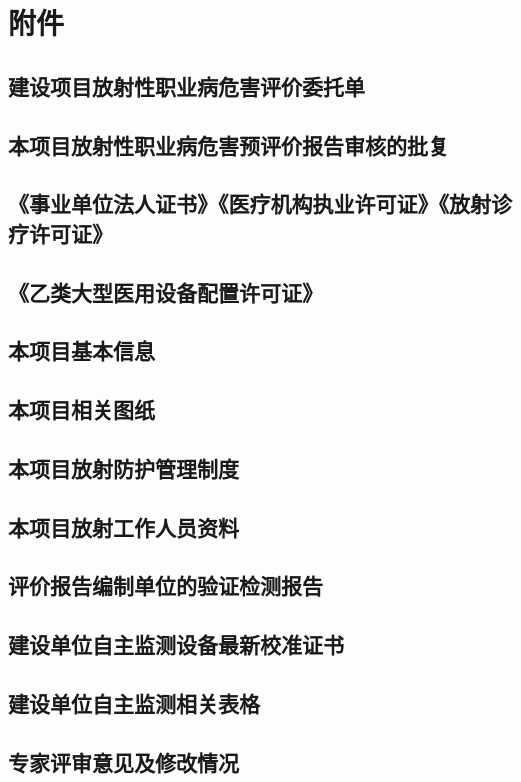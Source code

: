 \clearpage


\renewcommand{\thechapter}{}
\setcounter{chapter}{0}
\renewcommand{\thesection}{附件\arabic{section}}
\setcounter{section}{0}

\chapter*{附件}

\section{建设项目放射性职业病危害评价委托单}

\section{本项目放射性职业病危害预评价报告审核的批复}

\section{《事业单位法人证书》《医疗机构执业许可证》《放射诊疗许可证》}

\section{《乙类大型医用设备配置许可证》}

\section{本项目基本信息}

\section{本项目相关图纸}

\section{本项目放射防护管理制度}

\section{本项目放射工作人员资料}

\section{评价报告编制单位的验证检测报告}

\section{建设单位自主监测设备最新校准证书}

\section{建设单位自主监测相关表格}

\section{专家评审意见及修改情况}
